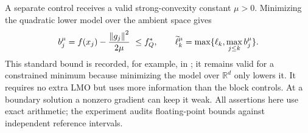 A separate control receives a valid strong-convexity constant $\mu>0$.
Minimizing the quadratic lower model over the ambient space gives
\[
 b_j^\mu=f(x_j)-\frac{\left\|g_j\right\|^2}{2\mu}\ \le f_Q^*,\qquad
 \widetilde\ell_k^\mu=\max\{\ell_k,\max_{j\le k}b_j^\mu\}.
\]
This standard bound is recorded, for example, in
\cite[Appendix B]{karimi}; it remains valid for a constrained minimum
because minimizing the model over $\mathbb R^d$ only lowers it.
It requires no extra LMO but uses more information than the block
controls. At a boundary solution a nonzero gradient can keep it weak.
All assertions here use exact arithmetic; the experiment audits
floating-point bounds against independent reference intervals.
